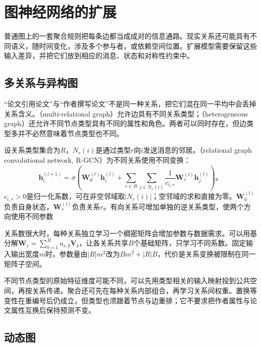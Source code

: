 \section{图神经网络的扩展}
\label{sec:gnn-extensions}

普通图上的一套聚合规则把每条边都当成成对的信息通路。现实关系还可能具有不同语义，随时间变化，涉及多个参与者，或依赖空间位置。扩展模型需要保留这些输入差异，并把它们放到相应的消息、状态和对称性约束中。

\subsection{多关系与异构图}
\label{sec:gnn-relational}

“论文引用论文”与“作者撰写论文”不是同一种关系，把它们混在同一平均中会丢掉关系含义。（multi-relational graph）允许边具有不同关系类型；（heterogeneous graph）还允许不同节点类型具有不同的属性和角色。两者可以同时存在，但边类型多并不必然意味着节点类型也不同。

设关系类型集合为$R$，$N_r(i)$是通过类型$r$向$i$发送消息的邻居。（relational graph convolutional network, R-GCN）为不同关系使用不同变换：
\begin{equation}
  \bm{h}_i^{(l+1)}=\sigma\!\left(
    \bm{W}_0^{(l)}\bm{h}_i^{(l)}+
    \sum_{r\in R}\sum_{j\in N_r(i)}
      \frac{1}{c_{i,r}}\bm{W}_r^{(l)}\bm{h}_j^{(l)}\right)\text{。}
  \label{eq:gnn-rgcn}
\end{equation}
$c_{i,r}>0$是归一化系数，可在非空邻域取$|N_r(i)|$；空邻域的求和直接为零。$\bm{W}_0^{(l)}$负责自身状态，$\bm{W}_r^{(l)}$负责关系$r$。有向关系可增加单独的逆关系类型，使两个方向使用不同参数

关系数很大时，每种关系独立学习一个稠密矩阵会增加参数与数据需求。可以用基分解$\bm{W}_r=\sum_{b=1}^{B}a_{r,b}\bm{V}_b$，让各关系共享$B$个基础矩阵，只学习不同系数。固定输入输出宽度$m$时，参数量由$|R|m^2$改为$Bm^2+|R|B$，代价是关系变换被限制在同一矩阵子空间。

不同节点类型的原始特征维度可能不同，可以先用类型相关的输入映射投到公共空间，再按关系传递。聚合还可先在每种关系内部组合，再学习关系间权重。置换等变性在重编号后仍成立，但类型也须跟着节点与边重排；它不要求把作者属性与论文属性互换后保持预测不变。

\subsection{动态图}
\label{sec:gnn-dynamic}


